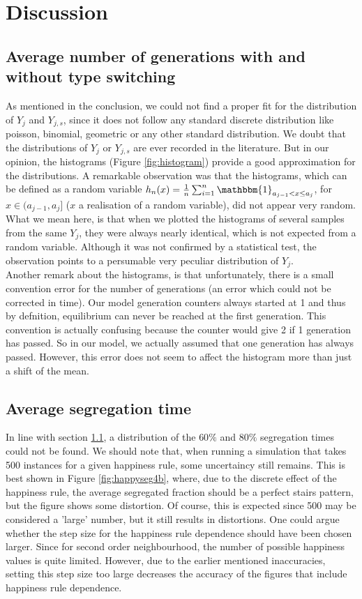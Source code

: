 \section{Discussion}
\subsection{Average number of generations with and without type switching}\label{subsec:discaveseg}
As mentioned in the conclusion, we could not find a proper fit for the distribution of $Y_{j}$ and $Y_{j,s}$, since it does not follow any standard discrete distribution like poisson, binomial, geometric or any other standard distribution. We doubt that the distributions of $Y_j$ or $Y_{j,s}$ are ever recorded in the literature. But in our opinion, the histograms (Figure \ref{fig:histogram}) provide a good approximation for the distributions. A remarkable observation was that the histograms, which can be defined as a random variable $h_n(x)=\frac{1}{n}\sum^n_{i=1}\mathbbm{1}_{a_{j-1}<x\leq a_j}$, for $x\in (a_{j-1},a_j]$ ($x$ a realisation of a random variable),  did not appear very random. What we mean here, is that when we plotted the histograms of several samples from the same $Y_j$, they were always nearly identical, which is not expected from a random variable. Although it was not confirmed by a statistical test, the observation points to a persumable very peculiar distribution of \(Y_j\).\\

Another remark about the histograms, is that unfortunately, there is a small convention error for the number of generations (an error which could not be corrected in time). Our model generation counters always started at 1 and thus by defnition, equilibrium can never be reached at the first generation. This convention is actually confusing because the counter would give 2 if 1 generation has passed. So in our model, we actually assumed that one generation has always passed. However, this error does not seem to affect the histogram more than just a shift of the mean.

\subsection{Average segregation time}
In line with section \ref{subsec:discaveseg}, a distribution of the $60\%$ and $80\%$ segregation times could not be found. We should note that, when running a simulation that takes 500 instances for a given happiness rule, some uncertaincy still remains. This is best shown in Figure \ref{fig:happyseg4b}, where, due to the discrete effect of the happiness rule, the average segregated fraction should be a perfect stairs pattern, but the figure shows some distortion. Of course, this is expected since 500 may be considered a 'large' number, but it still results in distortions. One could argue whether the step size for the happiness rule dependence should have been chosen larger. Since for second order neighbourhood, the number of possible happiness values is quite limited. However, due to the earlier mentioned inaccuracies, setting this step size too large decreases the accuracy of the figures that include happiness rule dependence.

